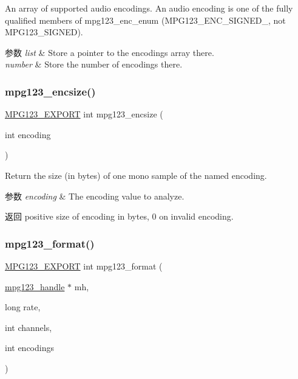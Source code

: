 An array of supported audio encodings. An audio encoding is one of the fully qualified members of mpg123\+\_\+enc\+\_\+enum (M\+P\+G123\+\_\+\+E\+N\+C\+\_\+\+S\+I\+G\+N\+E\+D\+\_, not M\+P\+G123\+\_\+\+S\+I\+G\+N\+ED). 
\begin{DoxyParams}{参数}
{\em list} & Store a pointer to the encodings array there. \\
\hline
{\em number} & Store the number of encodings there. \\
\hline
\end{DoxyParams}
\mbox{\label{group__mpg123__output_gaf12bd45d9040973c8c7b7b9411a530b5}} 
\subsubsection{\texorpdfstring{mpg123\+\_\+encsize()}{mpg123\_encsize()}}
{\footnotesize\ttfamily \hyperlink{mpg123_8h_a2ba98cfba3f760879df70e755b2a61cc}{M\+P\+G123\+\_\+\+E\+X\+P\+O\+RT} int mpg123\+\_\+encsize (\begin{DoxyParamCaption}\item[{int}]{encoding }\end{DoxyParamCaption})}

Return the size (in bytes) of one mono sample of the named encoding. 
\begin{DoxyParams}{参数}
{\em encoding} & The encoding value to analyze. \\
\hline
\end{DoxyParams}
\begin{DoxyReturn}{返回}
positive size of encoding in bytes, 0 on invalid encoding. 
\end{DoxyReturn}
\mbox{\label{group__mpg123__output_gadad5794afc300a997e517dbe397dc2c7}} 
\subsubsection{\texorpdfstring{mpg123\+\_\+format()}{mpg123\_format()}}
{\footnotesize\ttfamily \hyperlink{mpg123_8h_a2ba98cfba3f760879df70e755b2a61cc}{M\+P\+G123\+\_\+\+E\+X\+P\+O\+RT} int mpg123\+\_\+format (\begin{DoxyParamCaption}\item[{\hyperlink{group__mpg123__init_ga6728e2839a395f3a07d4514da659faca}{mpg123\+\_\+handle} $\ast$}]{mh,  }\item[{long}]{rate,  }\item[{int}]{channels,  }\item[{int}]{encodings }\end{DoxyParamCaption})}

